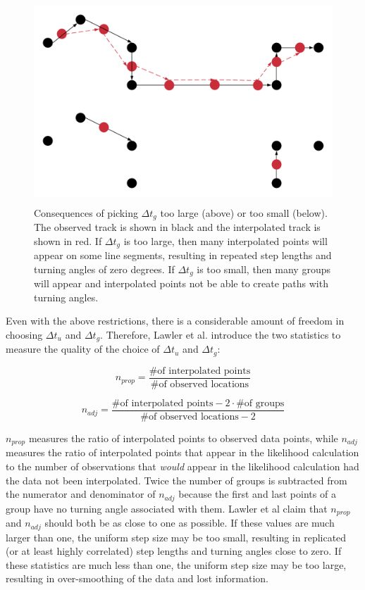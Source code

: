 \begin{figure}[h!]
	\centering
	\includegraphics[height=3in]{../Plots/Interpolation_Group.png}
	\caption{Consequences of picking $\Delta t_g$ too large (above) or too small (below). The observed track is shown in black and the interpolated track is shown in red. If $\Delta t_g$ is too large, then many interpolated points will appear on some line segments, resulting in repeated step lengths and turning angles of zero degrees. If $\Delta t_g$ is too small, then many groups will appear and interpolated points not be able to create paths with turning angles.}
	\label{fig:interpolation_group}
\end{figure}

Even with the above restrictions, there is a considerable amount of freedom in choosing $\Delta t_u$ and $\Delta t_g$. Therefore, Lawler et al. introduce the two statistics to measure the quality of the choice of $\Delta t_u$ and $\Delta t_g$:

$$n_{prop} = \frac{\text{\# of interpolated points}}{\text{\# of observed locations}}$$

$$n_{adj} = \frac{\text{\# of interpolated points} - 2 \cdot \text{\# of groups}}{\text{\# of observed locations} - 2}$$

$n_{prop}$ measures the ratio of interpolated points to observed data points, while $n_{adj}$ measures the ratio of interpolated points that appear in the likelihood calculation to the number of observations that \textit{would} appear in the likelihood calculation had the data not been interpolated. Twice the number of groups is subtracted from the numerator and denominator of $n_{adj}$ because the first and last points of a group have no turning angle associated with them. Lawler et al claim that $n_{prop}$ and $n_{adj}$ should both be as close to one as possible. If these values are much larger than one, the uniform step size may be too small, resulting in replicated (or at least highly correlated) step lengths and turning angles close to zero. If these statistics are much less than one, the uniform step size may be too large, resulting in over-smoothing of the data and lost information.

